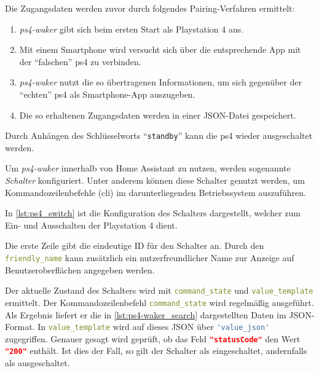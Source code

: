 Die Zugangsdaten werden zuvor durch folgendes Pairing-Verfahren ermittelt:
\begin{enumerate}
    \setlength\itemsep{-0.5em}
    \item \textit{ps4-waker} gibt sich beim ersten Start als Playstation 4 aus.
    \item Mit einem Smartphone wird versucht sich über die entsprechende App mit der \enquote{falschen} \ac{ps4} zu verbinden.
    \item \textit{ps4-waker} nutzt die so übertragenen Informationen, um sich gegenüber der \enquote{echten} \ac{ps4} als Smartphone-App auszugeben.
    \item Die so erhaltenen Zugangsdaten werden in einer JSON-Datei gespeichert.
\end{enumerate}

Durch Anhängen des Schlüsselworts \enquote{\lstinline[language=bash]{standby}} kann die
\ac{ps4} wieder ausgeschaltet werden.

Um \textit{ps4-waker} innerhalb von Home Assistant zu nutzen,
werden sogenannte \textit{Schalter} konfiguriert.
Unter anderem können diese Schalter genutzt werden, um Kommandozeilenbefehle (\ac{cli})
im darunterliegenden Betriebssystem auszuführen.

In \autoref{lst:ps4_switch} ist die Konfiguration des Schalters dargestellt,
welcher zum Ein- und Ausschalten der Playstation 4 dient.



Die erste Zeile gibt die eindeutige ID für den Schalter an.
Durch den \lstinline[language=yaml]{friendly_name} kann zusätzlich ein nutzerfreundlicher Name zur Anzeige auf Benutzeroberflächen angegeben werden.

Der aktuelle Zustand des Schalters wird mit \lstinline[language=yaml]{command_state}
und \lstinline[language=yaml]{value_template} ermittelt.
Der Kommandozeilenbefehl \lstinline[language=yaml]{command_state} wird regelmäßig ausgeführt.
Als Ergebnis liefert er die in \autoref{lst:ps4-waker_search} dargestellten Daten im JSON-Format.
In \lstinline[language=yaml]{value_template} wird auf dieses JSON über
\lstinline[language=yaml]{'value_json'} zugegriffen.
Genauer gesagt wird geprüft,
ob das Feld \lstinline[language=json]{"statusCode"} den Wert
\lstinline[language=json]{"200"} enthält.
Ist dies der Fall, so gilt der Schalter als eingeschaltet, andernfalls als ausgeschaltet.

